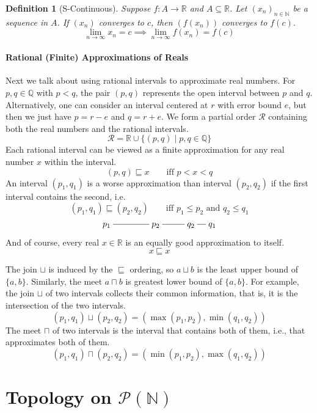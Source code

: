 \documentclass{article}
\newtheorem{definition}{Definition}%
\newcommand{\Reals}[0]{\mathbb{R}}
\newcommand{\Rats}[0]{\mathbb{Q}}
\begin{document}
\begin{definition}[S-Continuous]
  Suppose $f : A \to \Reals$ and $A \subseteq \Reals$.
  Let $(x_n)_{n \in \mathbb{N}}$ be a sequence in $A$.
  If $(x_n)$ converges to $c$, then $(f(x_n))$ converges to $f(c)$.
  \[
    \lim_{n\to\infty} x_n = c \implies
    \lim_{n\to\infty} f(x_n) = f(c)
  \]
\end{definition}


\paragraph{Rational (Finite) Approximations of Reals}

Next we talk about using rational intervals to approximate real
numbers. For $p,q \in \Rats$ with $p < q$, the pair $(p,q)$ represents
the open interval between $p$ and $q$. Alternatively, one can consider
an interval centered at $r$ with error bound $e$, but then we just
have $p = r-e$ and $q = r+e$.  We form a partial order $\mathcal{R}$
containing both the real numbers and the rational intervals.
\[
   \mathcal{R} = \Reals \cup \{ (p,q) \mid p,q \in \Rats \}
\]
Each rational interval can be viewed as a finite approximation for any
real number $x$ within the interval.
\[
  (p,q)  \sqsubseteq x \qquad \text{iff } p < x < q
\]
An interval $(p_1,q_1)$ is a worse approximation than interval
$(p_2,q_2)$ if the first interval contains the second, i.e.
\[
  (p_1,q_1) \sqsubseteq (p_2,q_2)
  \qquad
  \text{iff }
  p_1 \leq p_2
  \text{ and }
  q_2 \leq q_1
\]
\[
\xymatrix@=10pt{
  p_1 \ar@{-}[rrr] & & & p_2 \ar@{-}[rr] & & q_2 \ar@{-}[r] & q_1
}
\]
And of course, every real $x \in \Reals$ is an equally good
approximation to itself.
\[
  x \sqsubseteq x  
\]

The join $\sqcup$ is induced by the $\sqsubseteq$ ordering, so $a
\sqcup b$ is the least upper bound of $\{a,b\}$.  Similarly, the meet
$a \sqcap b$ is greatest lower bound of $\{a,b\}$.  For example, the
join $\sqcup$ of two intervals collects their common information, that
is, it is the intersection of the two intervals.
\[
  (p_1,q_1) \sqcup (p_2,q_2) = (\max(p_1, p_2), \min(q_1, q_2))
\]
The meet $\sqcap$ of two intervals is the interval that contains both
of them, i.e., that approximates both of them.
\[
  (p_1,q_1) \sqcap (p_2,q_2) = (\min(p_1, p_2), \max(q_1, q_2))
\]





\section{Topology on $\mathcal{P}(\mathbb{N})$}
\end{document}
